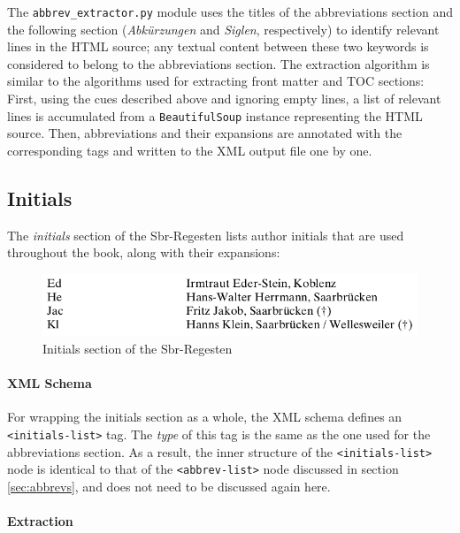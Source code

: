 The \texttt{abbrev\_extractor.py} module uses the titles of the
abbreviations section and the following section (\emph{Abkürzungen}
and \emph{Siglen}, respectively) to identify relevant lines in the
HTML source; any textual content between these two keywords is
considered to belong to the abbreviations section. The extraction
algorithm is similar to the algorithms used for extracting front
matter and TOC sections: First, using the cues described above and
ignoring empty lines, a list of relevant lines is accumulated from a
\texttt{BeautifulSoup} instance representing the HTML source. Then,
abbreviations and their expansions are annotated with the
corresponding tags and written to the XML output file one by one.

\subsection{Initials}
\label{sec:initials}

The \emph{initials} section of the Sbr-Regesten lists author initials
that are used throughout the book, along with their expansions:

\begin{figure}[h]
  \centering
  \includegraphics[scale=0.4]{img/initials}
  \caption{Initials section of the Sbr-Regesten}
  \label{fig:initials}
\end{figure}

\paragraph{XML Schema}

For wrapping the initials section as a whole, the XML schema defines
an \texttt{<initials-list>} tag. The \emph{type} of this tag is the
same as the one used for the abbreviations section. As a result, the
inner structure of the \texttt{<initials-list>} node is identical to
that of the \texttt{<abbrev-list>} node discussed in section
\ref{sec:abbrevs}, and does not need to be discussed again here.

\paragraph{Extraction}

